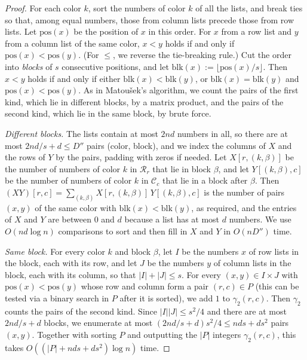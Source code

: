 \begin{proof}
For each color $k$, sort the numbers of color $k$ of all the lists, and break ties so that, among equal numbers, those from column lists precede those from row lists. Let $\mathrm{pos}(x)$ be the position of $x$ in this order. For $x$ from a row list and $y$ from a column list of the same color, $x<y$ holds if and only if $\mathrm{pos}(x)<\mathrm{pos}(y)$. (For $\le$, we reverse the tie-breaking rule.) Cut the order into \emph{blocks} of $s$ consecutive positions, and let $\mathrm{blk}(x):=\lfloor\mathrm{pos}(x)/s\rfloor$. Then $x<y$ holds if and only if either $\mathrm{blk}(x)<\mathrm{blk}(y)$, or $\mathrm{blk}(x)=\mathrm{blk}(y)$ and $\mathrm{pos}(x)<\mathrm{pos}(y)$. As in Matou\v sek's algorithm, we count the pairs of the first kind, which lie in different blocks, by a matrix product, and the pairs of the second kind, which lie in the same block, by brute force.

\emph{Different blocks.} The lists contain at most $2nd$ numbers in all, so there are at most $2nd/s+d\le D''$ pairs (color, block), and we index the columns of $X$ and the rows of $Y$ by the pairs, padding with zeros if needed. Let $X[r,(k,\beta)]$ be the number of numbers of color $k$ in $\mathcal R_r$ that lie in block $\beta$, and let $Y[(k,\beta),c]$ be the number of numbers of color $k$ in $\mathcal C_c$ that lie in a block after $\beta$. Then $(XY)[r,c]=\sum_{(k,\beta)}X[r,(k,\beta)]\,Y[(k,\beta),c]$ is the number of pairs $(x,y)$ of the same color with $\mathrm{blk}(x)<\mathrm{blk}(y)$, as required, and the entries of $X$ and $Y$ are between $0$ and $d$ because a list has at most $d$ numbers. We use $O(nd\log n)$ comparisons to sort and then fill in $X$ and $Y$ in 
 $O(nD'')$ time.

\emph{Same block.} For every color $k$ and block $\beta$, let $I$ be the numbers $x$ of row lists in the block, each with its row, and let $J$ be the numbers $y$ of column lists in the block, each with its column, so that $|I|+|J|\le s$. For every $(x,y)\in I\times J$ with $\mathrm{pos}(x)<\mathrm{pos}(y)$ whose row and column form a pair $(r,c)\in P$ (this can be tested via a binary search in $P$ after it is sorted), we add $1$ to $\gamma_2(r,c)$. Then $\gamma_2$ counts the pairs of the second kind. Since $|I||J|\le s^2/4$ and there are at most $2nd/s+d$ blocks, we enumerate at most $(2nd/s+d)s^2/4\le nds+ds^2$ pairs $(x,y)$. Together with sorting $P$ and outputting the $|P|$ integers $\gamma_2(r,c)$, this takes $O((|P|+nds+ds^2)\log n)$ time.
\end{proof}


